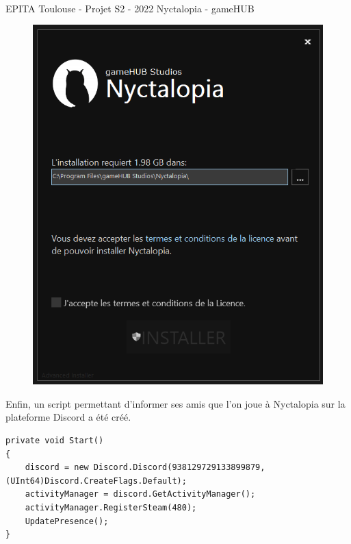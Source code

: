\vfill
\noindent\makebox[\linewidth]{\rule{.8\paperwidth}{.6pt}}\\[0.2cm]
EPITA Toulouse - Projet S2 - 2022 \hfill Nyctalopia - gameHUB
\noindent\makebox[\linewidth]{\rule{.8\paperwidth}{.6pt}}
\newpage

\begin{figure}[H]
\centering
\begin{minipage}{.5\textwidth}
  \centering
  \centerline{\includegraphics[width=1.5\linewidth]{img/ui/installer.png}}
  \label{fig:uiinstaller}
\end{minipage}%
\end{figure}

Enfin, un script permettant d'informer ses amis que l'on joue à Nyctalopia sur la plateforme Discord a été créé.

\begin{lstlisting}[language={[Sharp]C}, caption={Fonction C\# permettant de créer une activité Discord}, label={ScriptDRPC}]
private void Start()
{
    discord = new Discord.Discord(938129729133899879, (UInt64)Discord.CreateFlags.Default);
    activityManager = discord.GetActivityManager();
    activityManager.RegisterSteam(480);
    UpdatePresence();
}

\end{lstlisting}

